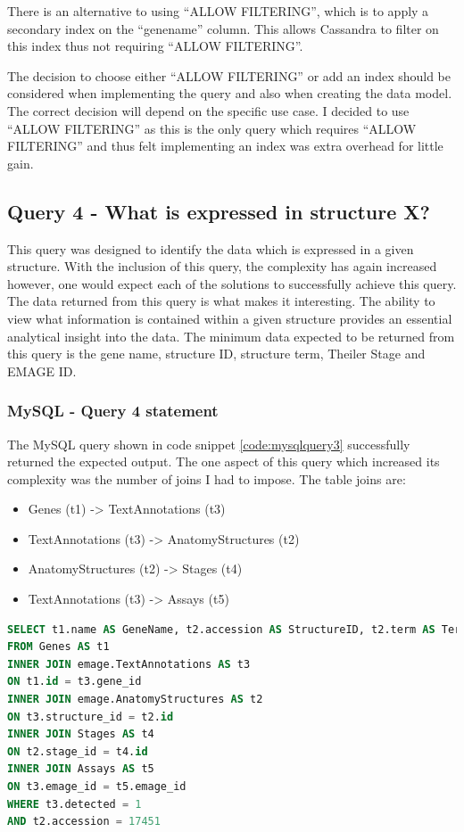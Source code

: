 There is an alternative to using ``ALLOW FILTERING'', which is to apply a secondary index on the ``genename'' column. This allows Cassandra to filter on this index thus not requiring ``ALLOW FILTERING''.

The decision to choose either ``ALLOW FILTERING'' or add an index should be considered when implementing the query and also when creating the data model. The correct decision will depend on the specific use case. I decided to use ``ALLOW FILTERING'' as this is the only query which requires ``ALLOW FILTERING'' and thus felt implementing an index was extra overhead for little gain.

\subsection*{Query 4 - What is expressed in structure X?}\label{query4}
This query was designed to identify the data which is expressed in a given structure. With the inclusion of this query, the complexity has again increased however, one would expect each of the solutions to successfully achieve this query. The data returned from this query is what makes it interesting. The ability to view what information is contained within a given structure provides an essential analytical insight into the data. The minimum data expected to be returned from this query is the gene name, structure ID, structure term, Theiler Stage and EMAGE ID.

\subsubsection*{MySQL - Query 4 statement}\label{mysqlquery4statement}
The MySQL query shown in code snippet \ref{code:mysqlquery3} successfully returned the expected output. The one aspect of this query which increased its complexity was the number of joins I had to impose. The table joins are:

\begin{itemize}
\item Genes (t1) -> TextAnnotations (t3)
\item TextAnnotations (t3) -> AnatomyStructures (t2)
\item AnatomyStructures (t2) -> Stages (t4)
\item TextAnnotations (t3) -> Assays (t5)
\end{itemize}

\begin{lstlisting}[language=SQL, caption=MySQL query 4 statement. What is expressed in structure X?., label=code:mysqlquery4]
SELECT t1.name AS GeneName, t2.accession AS StructureID, t2.term AS TermName, t4.theilerstage AS TheilerStage, t3.emage_id AS EMAGE_ID
FROM Genes AS t1
INNER JOIN emage.TextAnnotations AS t3
ON t1.id = t3.gene_id
INNER JOIN emage.AnatomyStructures AS t2
ON t3.structure_id = t2.id
INNER JOIN Stages AS t4
ON t2.stage_id = t4.id
INNER JOIN Assays AS t5
ON t3.emage_id = t5.emage_id
WHERE t3.detected = 1
AND t2.accession = 17451
\end{lstlisting}

